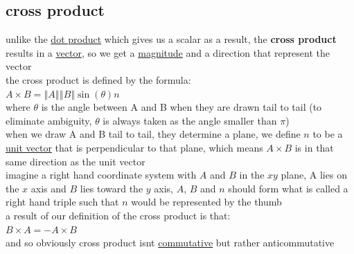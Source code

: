 \documentclass[a4paper,12pt]{article}
\begin{document}
\subsection{cross product}
\label{sec:orge4c1a00}
unlike the \hyperref[sec:org7fafbe9]{dot product} which gives us a scalar as a result, the \textbf{cross product} results in a \hyperref[sec:org103a65e]{vector}, so we get a \hyperref[sec:orgd47f5ea]{magnitude} and a direction that represent the vector\\
the cross product is defined by the formula:\\
\(A \times B = \left\Vert A \right\Vert \left\Vert B \right\Vert\sin(\theta)n\)\\
where \(\theta\) is the angle between A and B when they are drawn tail to tail (to eliminate ambiguity, \(\theta\) is always taken as the angle smaller than \(\pi\))\\
when we draw A and B tail to tail, they determine a plane, we define \(n\) to be a \hyperref[sec:orgc00677a]{unit vector} that is perpendicular to that plane, which means \(A\times B\) is in that same direction as the unit vector\\
imagine a right hand coordinate system with \(A\) and \(B\) in the \(xy\) plane, A lies on the \(x\) axis and \(B\) lies toward the \(y\) axis, \(A\), \(B\) and \(n\) should form what is called a right hand triple such that \(n\) would be represented by the thumb\\
a result of our definition of the cross product is that:\\
\(B\times A=-A\times B\)\\
and so obviously cross product isnt \href{20220923212910-commutative.org}{commutative} but rather anticommutative\\
\end{document}
